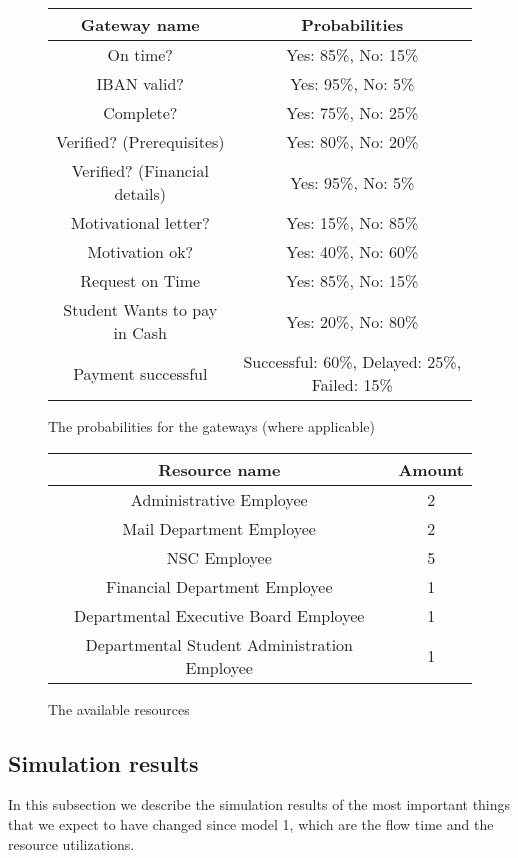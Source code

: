 \begin{figure}[h!]
	\centering
	\begin{tabular}{ | c | c | }
		\hline
		\textbf{Gateway name} & \textbf{Probabilities} \\ \hline\hline
		On time? & Yes: 85\%, No: 15\% \\ \hline
		IBAN valid? & Yes: 95\%, No: 5\% \\ \hline
		Complete? & Yes: 75\%, No: 25\% \\ \hline
		Verified? (Prerequisites) & Yes: 80\%, No: 20\% \\ \hline
		Verified? (Financial details) & Yes: 95\%, No: 5\% \\ \hline
		Motivational letter? & Yes: 15\%, No: 85\% \\ \hline
		Motivation ok? & Yes: 40\%, No: 60\% \\ \hline
		Request on Time & Yes: 85\%, No: 15\% \\ \hline	
		Student Wants to pay in Cash & Yes: 20\%, No: 80\% \\ \hline	
		Payment successful & Successful: 60\%, Delayed: 25\%, Failed: 15\% \\ \hline			
		\hline
	\end{tabular}
	\caption{The probabilities for the gateways (where applicable)}
	\label{fig:probabilities2}
\end{figure}

\begin{figure}[h!]
	\centering
	\begin{tabular}{ | c | c | }
		\hline
		\textbf{Resource name} & \textbf{Amount} \\ \hline\hline
		Administrative Employee & 2 \\ \hline		
		Mail Department Employee & 2 \\ \hline
		NSC Employee & 5 \\ \hline
		Financial Department Employee & 1 \\ \hline
		Departmental Executive Board Employee & 1 \\ \hline
		Departmental Student Administration Employee & 1 \\ \hline
		\hline
	\end{tabular}
	\caption{The available resources}
	\label{fig:resources2}
\end{figure}

\subsection{Simulation results}
In this subsection we describe the simulation results of the most important things that we expect to have changed since model 1, which are the flow time and the resource utilizations.\\

